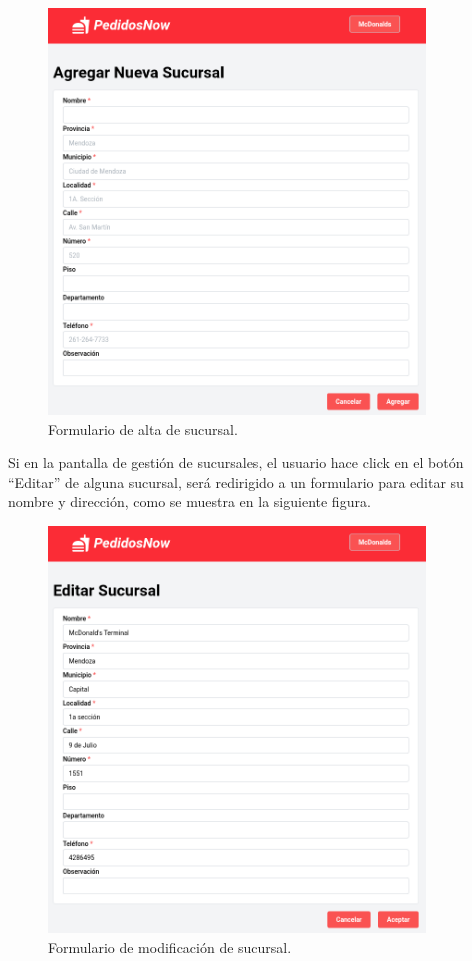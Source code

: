 \begin{figure}[H]
    \centering
    \includegraphics[width=10cm]{./img/locations-add.png}
    \caption{Formulario de alta de sucursal.}
\end{figure}

Si en la pantalla de gestión de sucursales, el usuario hace click en el botón ``Editar'' de alguna sucursal, será redirigido a un formulario para editar su nombre y dirección, como se muestra en la siguiente figura.

\begin{figure}[H]
    \centering
    \includegraphics[width=10cm]{./img/location-edit.png}
    \caption{Formulario de modificación de sucursal.}
\end{figure}

